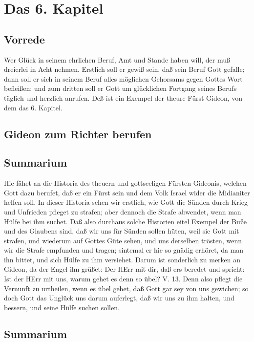 \chapter{Das 6. Kapitel}

\section{Vorrede}

Wer Glück in seinem ehrlichen Beruf, Amt und Stande haben will, der muß dreierlei in Acht nehmen. Erstlich soll er gewiß sein, daß sein Beruf Gott gefalle; dann soll er sich in seinem Beruf alles möglichen Gehorsams gegen Gottes Wort befleißen; und zum dritten soll er Gott um glücklichen Fortgang seines Berufs täglich und herzlich anrufen. Deß ist ein Exempel der theure Fürst Gideon, von dem das 6. Kapitel.

\section{Gideon zum Richter berufen}
\section{Summarium}

Hie fähet an die Historia des theuern und gottseeligen Fürsten Gideonis, welchen Gott dazu berufet, daß er ein Fürst sein und dem Volk Israel wider die Midianiter helfen soll. In dieser Historia sehen wir erstlich, wie Gott die Sünden durch Krieg und Unfrieden pfleget zu strafen; aber dennoch die Strafe abwendet, wenn man Hülfe bei ihm suchet. Daß also durchaus solche Historien eitel Exempel der Buße und des Glaubens sind, daß wir uns für Sünden sollen hüten, weil sie Gott mit strafen, und wiederum auf Gottes Güte sehen, und uns derselben trösten, wenn wir die Strafe empfunden und tragen; sintemal er hie so gnädig erhöret, da man ihn bittet, und sich Hülfe zu ihm versiehet. Darum ist sonderlich zu merken an Gideon, da der Engel ihn grüßet: Der HErr mit dir, daß ers beredet und spricht: Ist der HErr mit uns, warum gehet es denn so übel? V. 13.
Denn also pflegt die Vernunft zu urtheilen, wenn es übel gehet, daß Gott gar sey von uns gewichen; so doch Gott das Unglück uns darum auferlegt, daß wir uns zu ihm halten, und bessern, und seine Hülfe suchen sollen.

\section{Summarium}

